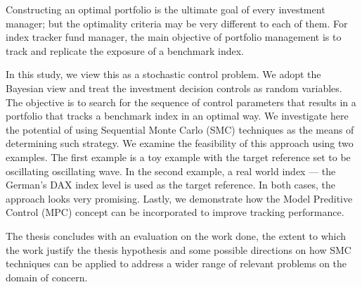 


\begin{abstracts}        %
  Constructing an optimal portfolio is the ultimate goal of every investment manager; but the optimality criteria may be very different to each of them. For index tracker fund manager, the main objective of portfolio management is to track and replicate the exposure of a benchmark index.

In this study, we view this as a stochastic control problem. We adopt the Bayesian view and treat the investment decision controls as random variables. The objective is to search for the sequence of control parameters that results in a portfolio that tracks a benchmark index in an optimal way. We investigate here the potential of using Sequential Monte Carlo (SMC) techniques as the means of determining such strategy. We examine the feasibility of this approach using two examples. The first example is a toy example with the target reference set to be oscillating oscillating wave. In the second example, a real world index --- the German's DAX index level is used as the target reference. In both cases, the approach looks very promising. Lastly, we demonstrate how the Model Preditive Control (MPC) concept can be incorporated to improve tracking performance.

  The thesis concludes with an evaluation on the work done, the extent
  to which the work justify the thesis hypothesis and some possible
  directions on how SMC techniques can be applied to address
  a wider range of relevant problems on the domain of concern.
\end{abstracts}





